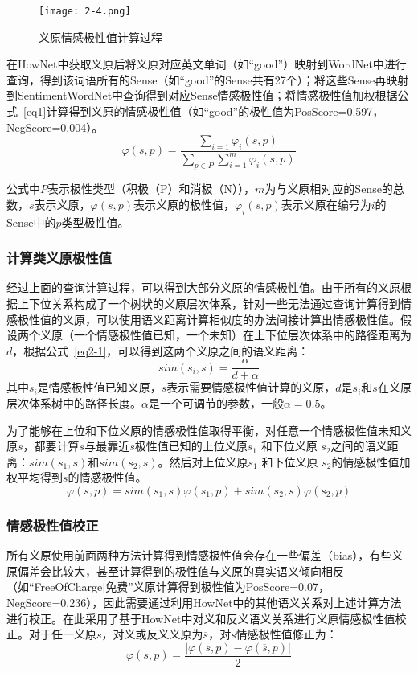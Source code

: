 \begin{figure}[htp]
\centering
\texttt{[image: 2-4.png]}
\caption{义原情感极性值计算过程}
\label{atomsen}
\end{figure}

在HowNet中获取义原后将义原对应英文单词（如“good”）映射到WordNet中进行查询，得到该词语所有的Sense（如“good”的Sense共有27个）；将这些Sense再映射到SentimentWordNet中查询得到对应Sense情感极性值；将情感极性值加权根据公式~\ref{eq1}计算得到义原的情感极性值（如“good”的极性值为PosScore=0.597，NegScore=0.004）。
\begin{equation}
\label{eq1}
\varphi(s,p)=\dfrac{\sum_{i=1} \varphi_i (s,p)}{\sum_{p\in P}\sum_{i=1}^m \varphi_i(s,p)}
\end{equation}

公式中$ P$表示极性类型（积极（P）和消极（N）），$m$为与义原相对应的Sense的总数，$s$表示义原，$\varphi(s,p)$表示义原的极性值，$\varphi_i (s,p)$表示义原在编号为$ i $的Sense中的$ p $类型极性值。

\subsubsection{计算类义原极性值}
经过上面的查询计算过程，可以得到大部分义原的情感极性值。由于所有的义原根据上下位关系构成了一个树状的义原层次体系，针对一些无法通过查询计算得到情感极性值的义原，可以使用语义距离计算相似度的办法间接计算出情感极性值。假设两个义原（一个情感极性值已知，一个未知）在上下位层次体系中的路径距离为$ d $，根据公式~\ref{eq2-1}，可以得到这两个义原之间的语义距离：
\begin{equation}
\label{eq2-1}
sim(s_i,s)=\dfrac{\alpha}{d+\alpha}
\end{equation}
其中$ s_i $是情感极性值已知义原，$ s $表示需要情感极性值计算的义原，$ d $是$ s_i $和$ s $在义原层次体系树中的路径长度。$ \alpha $是一个可调节的参数，一般$ \alpha=0.5 $。

为了能够在上位和下位义原的情感极性值取得平衡，对任意一个情感极性值未知义原$ s $，都要计算$ s $与最靠近$ s $极性值已知的上位义原$ s_1 $ 和下位义原 $ s_2 $之间的语义距离：$sim(s_1,s)$和$sim(s_2,s)$。然后对上位义原$ s_1 $ 和下位义原 $ s_2 $的情感极性值加权平均得到$ s $的情感极性值。
\begin{equation}
\varphi(s,p)=sim(s_1,s)\varphi(s_1,p)+sim(s_2,s)\varphi(s_2,p)
\end{equation}

\subsubsection{情感极性值校正}
所有义原使用前面两种方法计算得到情感极性值会存在一些偏差（bias），有些义原偏差会比较大，甚至计算得到的极性值与义原的真实语义倾向相反（如“FreeOfCharge$ | $免费”义原计算得到极性值为PosScore=0.07，NegScore=0.236），因此需要通过利用HowNet中的其他语义关系对上述计算方法进行校正。在此采用了基于HowNet中对义和反义语义关系进行义原情感极性值校正。对于任一义原$ s $，对义或反义义原为$ \overline{s} $，对$ s $情感极性值修正为：
\begin{equation}
\varphi(s,p)=\dfrac{|\varphi(s,p)-\varphi(\overline{s} ,p)|}{2}
\end{equation}



